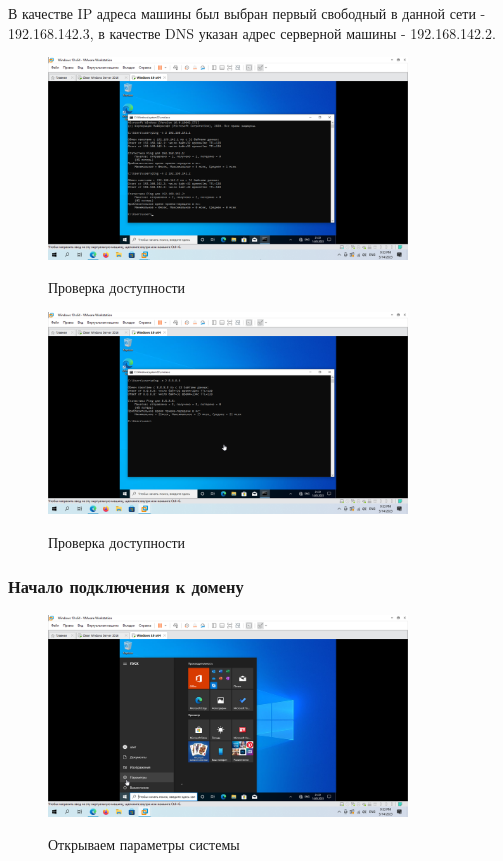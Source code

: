 \documentclass[a4paper]{article}
\begin{document}
  В качестве IP адреса машины был выбран первый свободный в данной сети - 192.168.142.3,
  в качестве DNS указан адрес серверной машины - 192.168.142.2.

  \begin{figure}[H]
    \centering
    \includegraphics[width=0.85\textwidth]{5_0068}
    \label{img:68}
    \caption{Проверка доступности}
  \end{figure}

  \begin{figure}[H]
    \centering
    \includegraphics[width=0.85\textwidth]{5_0069}
    \label{img:69}
    \caption{Проверка доступности}
  \end{figure}

  \subsubsection{Начало подключения к домену}

  \begin{figure}[H]
    \centering
    \includegraphics[width=0.85\textwidth]{5_0070}
    \label{img:70}
    \caption{Открываем параметры системы}
  \end{figure}
\end{document}
